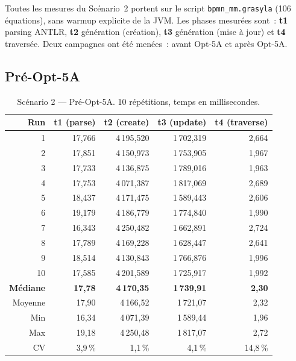 Toutes les mesures du Scénario~2 portent sur le script
\texttt{bpmn\_mm.grasyla} (106 équations), sans warmup explicite de la
JVM. Les phases mesurées sont~: \textbf{t1} parsing ANTLR, \textbf{t2}
génération (création), \textbf{t3} génération (mise à jour) et
\textbf{t4} traversée. Deux campagnes ont été menées~: avant Opt-5A et après Opt-5A.

\subsection*{Pré-Opt-5A}

\begin{table}[h]
\centering
\caption{Scénario 2 --- Pré-Opt-5A. 10 répétitions, temps en
millisecondes.}
\begin{tabular}{rrrrr}
\hline
\textbf{Run} & \textbf{t1 (parse)} & \textbf{t2 (create)} &
\textbf{t3 (update)} & \textbf{t4 (traverse)} \\
\hline
1  & 17,766 & 4\,195,520 & 1\,702,319 & 2,664 \\
2  & 17,851 & 4\,150,973 & 1\,753,905 & 1,967 \\
3  & 17,733 & 4\,136,875 & 1\,789,016 & 1,963 \\
4  & 17,753 & 4\,071,387 & 1\,817,069 & 2,689 \\
5  & 18,437 & 4\,171,475 & 1\,589,443 & 2,606 \\
6  & 19,179 & 4\,186,779 & 1\,774,840 & 1,990 \\
7  & 16,343 & 4\,250,482 & 1\,662,891 & 2,724 \\
8  & 17,789 & 4\,169,228 & 1\,628,447 & 2,641 \\
9  & 18,514 & 4\,130,843 & 1\,766,876 & 1,996 \\
10 & 17,585 & 4\,201,589 & 1\,725,917 & 1,992 \\
\hline
\textbf{Médiane}  & \textbf{17,78}  & \textbf{4\,170,35} & \textbf{1\,739,91} & \textbf{2,30} \\
Moyenne           & 17,90           & 4\,166,52          & 1\,721,07          & 2,32 \\
Min               & 16,34           & 4\,071,39          & 1\,589,44          & 1,96 \\
Max               & 19,18           & 4\,250,48          & 1\,817,07          & 2,72 \\
CV                & 3,9\,\%         & 1,1\,\%            & 4,1\,\%            & 14,8\,\% \\
\hline
\end{tabular}
\end{table}

